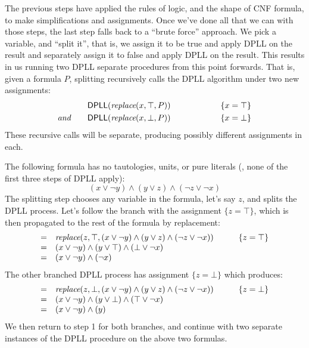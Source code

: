 The previous steps have applied the rules of logic, and the shape
of CNF formula, to make simplifications and assignments. Once we've
done all that we can with those steps, the last step falls back to
a ``brute force'' approach. We pick a variable, and ``split it'', that is,
we assign it to be true and apply DPLL on the result and separately
assign it to false and apply DPLL on the result. This results
in us running two DPLL separate procedures from this
point forwards. That is, given a formula $P$, splitting recursively calls the
DPLL algorithm under two new assignments:
%
\begin{align*}
             & \textsf{DPLL}(\textit{replace}(x, \top, P)) \qquad\qquad\qquad \{x =
               \top\}  \\
\textit{and} \qquad &  \textsf{DPLL}(\textit{replace}(x, \bot, P)) \qquad\qquad\qquad \{x = \bot\}
\end{align*}
%
These recursive calls will be separate, producing
possibly different assignments in each.

\begin{example}
The following formula has no tautologies, units, or pure literals
(\ie{}, none of the first three steps of DPLL apply):
%
\begin{equation*}
(x \vee \neg y) \wedge (y \vee z) \wedge (\neg z \vee \neg x)
\end{equation*}
%
The splitting step chooses any variable in the formula, let's say
$z$, and splits the DPLL process.
Let's follow the branch with the assignment $\{z = \top\}$,
which is then propagated to the rest of the formula by replacement:
\begin{align*}
\begin{array}{rll}
= & \textit{replace}(z, \top, (x \vee \neg y) \wedge (y \vee z) \wedge (\neg z \vee \neg x))
& \qquad \{z = \top\} \\
= & (x \vee \neg y) \wedge (y \vee \top) \wedge (\bot \vee \neg x) \\
= & (x \vee \neg y) \wedge (\neg x) \\
\end{array}
\end{align*}
The other branched DPLL process has assignment $\{z = \bot\}$ which
produces:
%
\begin{align*}
\begin{array}{rll}
= & \subst{\bot}{z}{(x \vee \neg y) \wedge (y \vee z) \wedge (\neg z \vee \neg x)}
& \qquad \{z = \bot\} \\
= & (x \vee \neg y) \wedge (y \vee \bot) \wedge (\top \vee \neg x) \\
= & (x \vee \neg y) \wedge (y)
\end{array}
%
\end{align*}
We then return to step 1 for both branches, and continue with two
separate instances of the DPLL procedure on the above two formulas.
%
\end{example}

